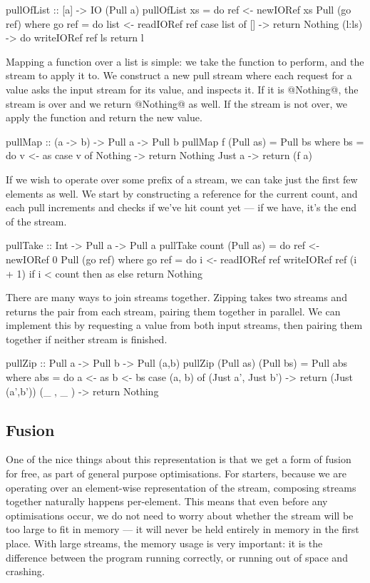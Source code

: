 \begin{code}
pullOfList :: [a] -> IO (Pull a)
pullOfList xs = do
  ref <- newIORef xs 
  Pull (go ref)
 where
  go ref = do
    list <- readIORef ref
    case list of
     []     -> return Nothing
     (l:ls) -> do
      writeIORef ref ls
      return l
\end{code}

Mapping a function over a list is simple: we take the function to perform, and the stream to apply it to.
We construct a new pull stream where each request for a value asks the input stream for its value, and inspects it.
If it is @Nothing@, the stream is over and we return @Nothing@ as well. If the stream is not over, we apply the function and return the new value.

\begin{code}
pullMap :: (a -> b) -> Pull a -> Pull b
pullMap f (Pull as) = Pull bs
 where
  bs = do
   v <- as
   case v of
    Nothing -> return Nothing
    Just a  -> return (f a)
\end{code}

If we wish to operate over some prefix of a stream, we can take just the first few elements as well. We start by constructing a reference for the current count, and each pull increments and checks if we've hit count yet --- if we have, it's the end of the stream.

\begin{code}
pullTake :: Int -> Pull a -> Pull a
pullTake count (Pull as) = do
  ref <- newIORef 0 
  Pull (go ref)
 where
  go ref = do
    i <- readIORef ref
    writeIORef ref (i + 1)
    if i < count
      then as
      else return Nothing
\end{code}

There are many ways to join streams together. Zipping takes two streams and returns the pair from each stream, pairing them together in parallel.
We can implement this by requesting a value from both input streams, then pairing them together if neither stream is finished.

\begin{code}
pullZip :: Pull a -> Pull b -> Pull (a,b)
pullZip (Pull as) (Pull bs) = Pull abs
 where
  abs = do
   a <- as
   b <- bs
   case (a, b) of
    (Just a', Just b') -> return (Just (a',b'))
    (_      , _      ) -> return  Nothing
\end{code}

\subsection{Fusion}
One of the nice things about this representation is that we get a form of fusion for free, as part of general purpose optimisations.
For starters, because we are operating over an element-wise representation of the stream, composing streams together naturally happens per-element.
This means that even before any optimisations occur, we do not need to worry about whether the stream will be too large to fit in memory --- it will never be held entirely in memory in the first place.
With large streams, the memory usage is very important: it is the difference between the program running correctly, or running out of space and crashing.

